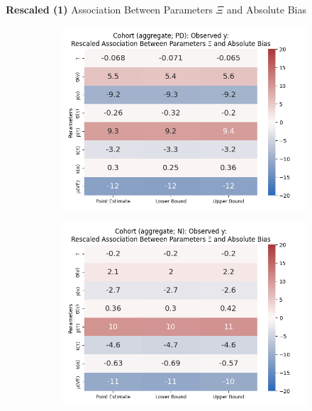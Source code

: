 \documentclass[aspectratio=169]{beamer}
\begin{document}
\begin{frame}{\textbf{Rescaled (1)} Association Between Parameters $\Xi$ and Absolute Bias}
\begin{figure}[H]
\begin{subfigure}[t]{0.23\linewidth}
		\end{subfigure}
		\begin{subfigure}[t]{0.23\linewidth}
			\centering
			\includegraphics[scale=0.25]{VEMethod_Drivers1b_FEest_Realistic_Li_MSpec_Heatmap7.png}
		\end{subfigure}
		\begin{subfigure}[t]{0.23\linewidth}
			\centering
			\includegraphics[scale=0.25]{VEMethod_Drivers1b_FEest_Realistic_Li_MSpec_Heatmap8.png}
		\end{subfigure}
		

\end{figure}
\end{frame}
\end{document}
